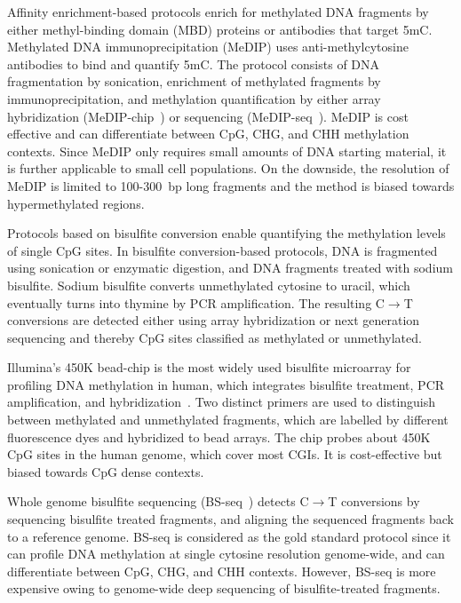 Affinity enrichment-based protocols enrich for methylated DNA fragments by either methyl-binding domain (MBD) proteins or antibodies that target 5mC. Methylated DNA immunoprecipitation (MeDIP) uses anti-methylcytosine antibodies to bind and quantify 5mC. The protocol consists of DNA fragmentation by sonication, enrichment of methylated fragments by immunoprecipitation, and methylation quantification by either array hybridization (MeDIP-chip~\citep{park-sarge_methylated_2009}) or sequencing (MeDIP-seq~\citep{brinkman_whole-genome_2010}). MeDIP is cost effective and can differentiate between CpG, CHG, and CHH methylation contexts. Since MeDIP only requires small amounts of DNA starting material, it is further applicable to small cell populations. On the downside, the resolution of MeDIP is limited to 100-300~bp long fragments and the method is biased towards hypermethylated regions.

Protocols based on bisulfite conversion enable quantifying the methylation levels of single CpG sites. In bisulfite conversion-based protocols, DNA is fragmented using sonication or enzymatic digestion, and DNA fragments treated with sodium bisulfite. Sodium bisulfite converts unmethylated cytosine to uracil, which eventually turns into thymine by PCR amplification. The resulting C$\rightarrow$T conversions are detected either using array hybridization or next generation sequencing and thereby CpG sites classified as methylated or unmethylated.

Illumina's 450K bead-chip is the most widely used bisulfite microarray for profiling DNA methylation in human, which integrates bisulfite treatment, PCR amplification, and hybridization~\citep{bibikova_high_2011-1}. Two distinct primers are used to distinguish between methylated and unmethylated fragments, which are labelled by different fluorescence dyes and hybridized to bead arrays.  The chip probes about 450K CpG sites in the human genome, which cover most CGIs. It is cost-effective but biased towards CpG dense contexts.

Whole genome bisulfite sequencing (BS-seq~\citep{urich_methylc-seq_2015}) detects C$\rightarrow$T conversions by sequencing bisulfite treated fragments, and aligning the sequenced fragments back to a reference genome. BS-seq is considered as the gold standard protocol since it can profile DNA methylation at single cytosine resolution genome-wide, and can differentiate between CpG, CHG, and CHH contexts. However, BS-seq is more expensive owing to genome-wide deep sequencing of bisulfite-treated fragments.

